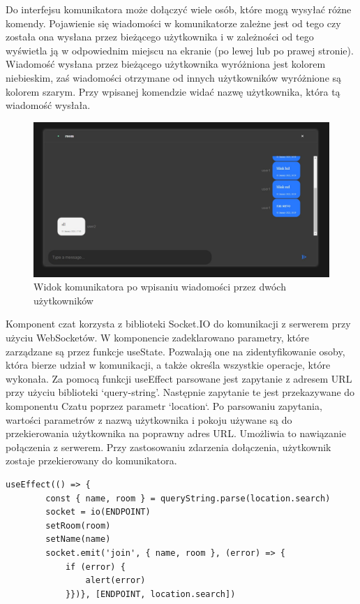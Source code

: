 Do interfejsu komunikatora może dołączyć wiele osób, które mogą wysyłać różne komendy. Pojawienie się wiadomości w komunikatorze zależne jest od tego czy została ona wysłana przez bieżącego użytkownika i w zależności od tego wyświetla ją w odpowiednim miejscu na ekranie (po lewej lub po prawej stronie). Wiadomość wysłana przez bieżącego użytkownika wyróżniona jest kolorem niebieskim, zaś wiadomości otrzymane od innych użytkowników wyróżnione są kolorem szarym. Przy wpisanej komendzie widać nazwę użytkownika, która tą wiadomość wysłała.
\begin{figure}
	\centering
	\includegraphics[width=0.5\linewidth]{"obrazy/interface2.jpg"}
	\caption{Widok komunikatora po wpisaniu wiadomości przez dwóch użytkowników}
	\label{fig:13}
\end{figure}
Komponent czat korzysta z biblioteki Socket.IO do komunikacji z serwerem przy użyciu WebSocketów. W komponencie zadeklarowano parametry, które zarządzane są przez funkcje useState. Pozwalają one na zidentyfikowanie osoby, która bierze udział w komunikacji, a także określa wszystkie operacje, które wykonała. Za pomocą funkcji useEffect parsowane jest zapytanie z adresem URL przy użyciu biblioteki ‘query-string’. Następnie zapytanie te jest przekazywane do komponentu Czatu poprzez parametr `location`. Po parsowaniu zapytania, wartości parametrów z nazwą użytkownika i pokoju używane są do przekierowania użytkownika na poprawny adres URL. Umożliwia to nawiązanie połączenia z serwerem. Przy zastosowaniu zdarzenia dołączenia, użytkownik zostaje przekierowany do komunikatora.
\begin{lstlisting}[caption=Implementacja funkcji dolaczenia do komunikatora po stronie klienta]
useEffect(() => {
        const { name, room } = queryString.parse(location.search)
        socket = io(ENDPOINT)
        setRoom(room)
        setName(name)
        socket.emit('join', { name, room }, (error) => {
            if (error) {
                alert(error)
            }})}, [ENDPOINT, location.search])
\end{lstlisting}

